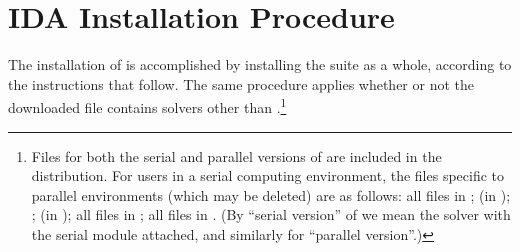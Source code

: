 \chapter{IDA Installation Procedure}\label{s:install}

The installation of {\ida} is accomplished by installing the
{\sundials} suite as a whole, according to the instructions that
follow.   The same procedure applies whether or not the downloaded
file contains solvers other than {\ida}.\footnote{Files for both the
serial and parallel versions of {\ida} are included in the distribution.
For users in a serial computing environment, the files specific to parallel
environments (which may be deleted) are as follows:
all files in ;
 (in );
; 
 (in );
all files in ;
all files in .
(By ``serial version'' of {\ida} we mean the {\ida} solver with the
serial {\nvector} module attached, and similarly for ``parallel version''.)}

